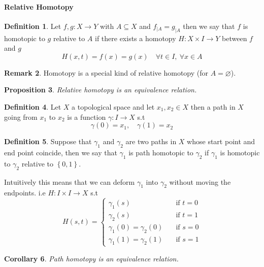\documentclass[11pt,a4paper]{article}
\theoremstyle{definition}
\newtheorem{definition}{Definition}[section]
\newtheorem{remark}[definition]{Remark}
\theoremstyle{plain}
\newtheorem{proposition}[definition]{Proposition}
\newtheorem{corollary}[definition]{Corollary}
\theoremstyle{remark}
\renewcommand{\set}[1]{\left\{ #1 \right\}}
\newcommand{\1}{\mathbbm{1}}
\begin{document}
\paragraph{Relative Homotopy}
\begin{definition}
    Let $f,  g \colon X \to Y$ with $A \subseteq X$ and $f_{|A} = g_{|A}$ then 
    we say that $f$ is homotopic to $g$ relative to $A$ if there exists a homotopy $H \colon X \times I \to Y$ between $f$ and $g$ 
    $$H(x, t) = f(x) = g(x) \quad \forall t \in I, \ \forall x \in A$$ 
\end{definition}

\begin{remark}
    Homotopy is a special kind of relative  homotopy (for $A = \varnothing$). 
\end{remark}

\begin{proposition}
    Relative homotopy is an equivalence relation.
\end{proposition}

\begin{definition}
    Let $X$ a topological space and let $x_1, x_2 \in X$ then a path in $X$ going from $x_1$ to $x_2$ is a 
    function $\gamma \colon I \to X$ s.t 
    $$\gamma (0) = x_1, \quad \gamma(1) = x_2$$
\end{definition}

\begin{definition}
    Suppose that $\gamma_1$ and $\gamma_2$ are two paths in $X$ whose start point and end point coincide, then 
    we say that $\gamma_1$ is path homotopic to $\gamma_2$ if $\gamma_1$ is homotopic to $\gamma_2$ relative to $\set{0,1}$.

    Intuitively this means that we can deform $\gamma_1$ into $\gamma_2$ without moving the endpoints.
    i.e $H \colon I \times I \to X$ s.t 
    $$H (s,t) = \begin{cases}
        \gamma_1(s) \quad &\text{if } t = 0 \\
        \gamma_2(s) \quad &\text{if } t = 1 \\
        \gamma_1(0) = \gamma_2 (0) \quad &\text{if } s = 0 \\
        \gamma_1(1) = \gamma_2(1) \quad&\text{if } s = 1
    \end{cases}$$
\end{definition}

\begin{corollary}
    Path homotopy is an equivalence relation.
\end{corollary}
\end{document}

